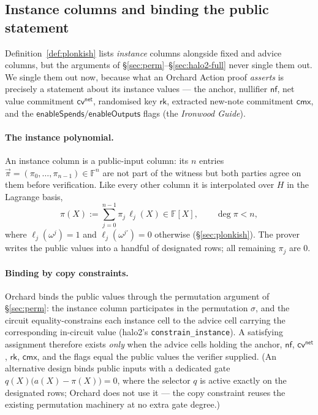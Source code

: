 \documentclass[11pt,a4paper]{article}
\theoremstyle{definition}
\newcommand{\F}{\mathbb{F}}
\newcommand{\nfsym}{\mathsf{nf}}
\newcommand{\cmx}{\mathsf{cmx}}
\newcommand{\cvsym}{\mathsf{cv}}
\newcommand{\rk}{\mathsf{rk}}
\begin{document}
\subsection{Instance columns and binding the public statement}\label{sec:instance}

Definition~\ref{def:plonkish} lists \emph{instance} columns alongside fixed
and advice columns, but the arguments of \S\ref{sec:perm}--\S\ref{sec:halo2-full}
never single them out. We single them out now, because what an Orchard Action proof
\emph{asserts} is precisely a statement about its instance values --- the
anchor, nullifier $\nfsym$, net value commitment $\cvsym^{\mathsf{net}}$,
randomised key $\rk$, extracted new-note commitment $\cmx$, and the
$\mathsf{enableSpends}/\mathsf{enableOutputs}$
flags (the \emph{Ironwood Guide}).

\paragraph{The instance polynomial.}
An instance column is a public-input column: its $n$ entries
$\vec{\pi} = (\pi_0, \dots, \pi_{n-1}) \in \F^n$ are not part of the
witness but both parties agree on them before verification. Like every
other column it is interpolated over $H$ in the Lagrange basis,
\[
\pi(X) := \sum_{j=0}^{n-1} \pi_j\, \ell_j(X) \in \F[X], \qquad \deg \pi < n,
\]
where $\ell_j(\omega^j) = 1$ and $\ell_j(\omega^{j'}) = 0$ otherwise
(\S\ref{sec:plonkish}). The prover writes the public values into a handful of
designated rows; all remaining $\pi_j$ are $0$.

\paragraph{Binding by copy constraints.}
Orchard binds the public values through the permutation argument of
\S\ref{sec:perm}: the instance column participates in the permutation
$\sigma$, and the circuit equality-constrains each instance cell to the
advice cell carrying the corresponding in-circuit value (halo2's
\texttt{constrain\_instance}). A satisfying assignment therefore exists
\emph{only} when the advice cells holding the anchor, $\nfsym$,
$\cvsym^{\mathsf{net}}$, $\rk$, $\cmx$, and the flags equal the public values the
verifier supplied. (An alternative design binds public inputs with a
dedicated gate $q(X)\bigl(a(X) - \pi(X)\bigr) = 0$, where the selector
$q$ is active exactly on the designated rows; Orchard does not use it ---
the copy constraint reuses the existing permutation machinery at no extra
gate degree.)
\end{document}
